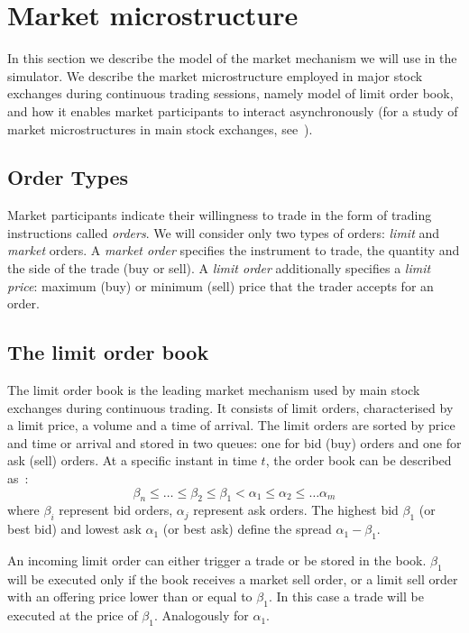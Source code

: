 \section{Market microstructure}
\label{Chapters/Background/Market-Architecture}

In this section we describe the model of the market mechanism we will use in the simulator. We describe the market microstructure employed in major stock exchanges during continuous trading sessions, namely model of limit order book, and how it enables market participants to interact asynchronously (for a study of market microstructures in main stock exchanges, see~\cite{Comerton2004}). 

\subsection{Order Types}
Market participants indicate their willingness to trade in the form of trading instructions called \textit{orders}. We will consider only two types of orders: \textit{limit} and \textit{market} orders. A \textit{market order} specifies the instrument to trade, the quantity and the side of the trade (buy or sell). A \textit{limit order} additionally specifies a \textit{limit price}: maximum (buy) or minimum (sell) price that the trader accepts for an order. 

\subsection{The limit order book}
The limit order book is the leading market mechanism used by main stock exchanges during continuous trading. It consists of limit orders, characterised by a limit price, a volume and a time of arrival. The limit orders are sorted by price and time or arrival and stored in two queues: one for bid (buy) orders and one for ask (sell) orders. At a specific instant in time $t$, the order book can be described as~\cite{Gilles2006}: 
\begin{equation*}
\beta_n \leq \ldots \leq \beta_2 \leq \beta_1 < \alpha_1 \leq \alpha_2 \leq \ldots \alpha_m
\end{equation*}
where $\beta_i$ represent bid orders, $\alpha_j$ represent ask orders. The highest bid $\beta_1$ (or best bid) and lowest ask $\alpha_1$ (or best ask) define the spread $\alpha_1 - \beta_1$.

An incoming limit order can either trigger a trade or be stored in the book.    $\beta_1$ will be executed only if the book receives a market sell order, or a limit sell order with an offering price lower than or equal to $\beta_1$. In this case a trade will be executed at the price of $\beta_1$. Analogously for $\alpha_1$.






